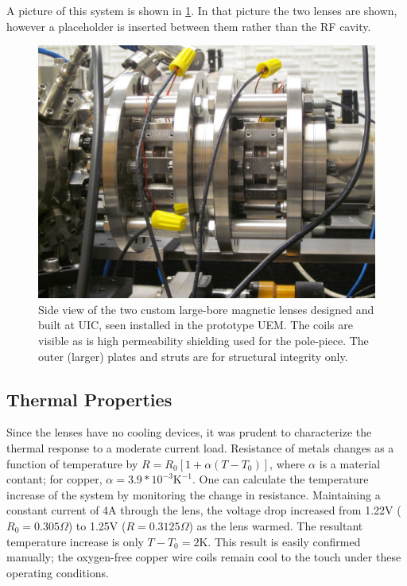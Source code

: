 A picture of this system is shown in \ref{fig:maglens-pic}.
In that picture the two lenses are shown, however a placeholder is inserted between them rather than the RF cavity.

\begin{figure}
  \centering
  \includegraphics{maglens.jpg}
  \caption{
    Side view of the two custom large-bore magnetic lenses designed and built at UIC, seen installed in the prototype UEM.
    The coils are visible as is high permeability shielding used for the pole-piece.
    The outer (larger) plates and struts are for structural integrity only.
  }
  \label{fig:maglens-pic}
\end{figure}

\subsection{Thermal Properties}

Since the lenses have no cooling devices, it was prudent to characterize the thermal response to a moderate current load.
Resistance of metals changes as a function of temperature by $ R = R_0 [ 1 + \alpha ( T - T_0 ) ] $, where $\alpha$ is a material contant; for copper, $\alpha = 3.9 * 10^{-3} \text{K}^{-1}$. 
One can calculate the temperature increase of the system by monitoring the change in resistance.
Maintaining a constant current of 4A through the lens, the voltage drop increased from 1.22V ($R_0 = 0.305\Omega$) to 1.25V ($R=0.3125\Omega$) as the lens warmed.
The resultant temperature increase is only $T - T_0 = 2\text{K}$.
This result is easily confirmed manually; the oxygen-free copper wire coils remain cool to the touch under these operating conditions.

